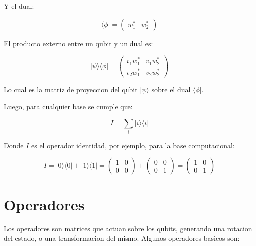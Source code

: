 \documentclass[11pt]{article}
\begin{document}
Y el dual:

\begin{equation}
    \langle \phi | = \begin{pmatrix} w_1^* & w_2^* \end{pmatrix}
\end{equation}

El producto externo entre un qubit y un dual es:

\begin{equation}
    |\psi\rangle \langle \phi | = \begin{pmatrix} v_1 w_1^* & v_1 w_2^* \\ v_2 w_1^* & v_2 w_2^* \end{pmatrix}
\end{equation}

Lo cual es la matriz de proyeccion del qubit $|\psi\rangle$ sobre el dual $\langle \phi |$.

Luego, para cualquier base se cumple que:

\begin{equation}
    I = \sum_{i} |i\rangle \langle i |
\end{equation}

Donde $I$ es el operador identidad, por ejemplo, para la base computacional:

\begin{equation}
    I = |0\rangle \langle 0| + |1\rangle \langle 1| = \begin{pmatrix} 1 & 0 \\ 0 & 0 \end{pmatrix} + \begin{pmatrix} 0 & 0 \\ 0 & 1 \end{pmatrix} = \begin{pmatrix} 1 & 0 \\ 0 & 1 \end{pmatrix}
\end{equation}

\section{Operadores}

Los operadores son matrices que actuan sobre los qubits, generando una rotacion del estado, o una transformacion del mismo. Algunos operadores basicos son:
\end{document}

